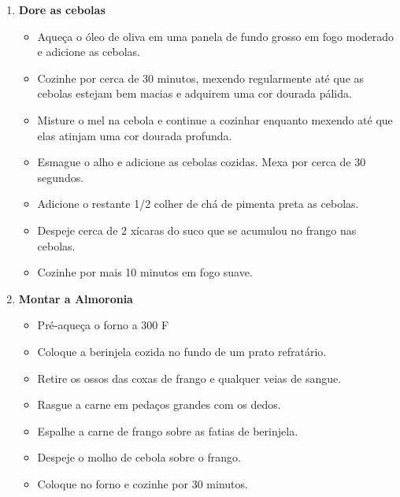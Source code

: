 \documentclass [11pt, papel de carta] {article}
\begin{document}
\begin {description}
\begin {enumerate}
\item {\bf Dore as cebolas}
\begin {itemize}
\item Aqueça o óleo de oliva em uma panela de fundo grosso em fogo moderado e adicione as cebolas.
\item Cozinhe por cerca de 30 minutos, mexendo regularmente até que as cebolas estejam bem macias e adquirem uma cor dourada pálida.
\item Misture o mel na cebola e continue a cozinhar enquanto mexendo até que elas atinjam uma cor dourada profunda.
\item Esmague o alho e adicione as cebolas cozidas. Mexa por cerca de 30 segundos.
\item Adicione o restante 1/2 colher de chá de pimenta preta as cebolas.
\item Despeje cerca de 2 xícaras do suco que se acumulou no frango nas cebolas.
\item Cozinhe por mais 10 minutos em fogo suave.
\end {itemize}
\item {\bf Montar a Almoronia}
\begin {itemize}
\item Pré-aqueça o forno a 300 F
\item Coloque a berinjela cozida no fundo de um prato refratário.
\item Retire os ossos das coxas de frango e qualquer veias de sangue.
\item Rasgue a carne em pedaços grandes com os dedos.
\item Espalhe a carne de frango sobre as fatias de berinjela.
\item Despeje o molho de cebola sobre o frango.
\item Coloque no forno e cozinhe por 30 minutos.
\end {itemize}
\end {enumerate}
\end {description}
\end{document}
